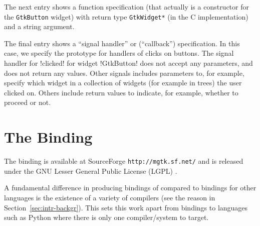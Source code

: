 \documentclass[workingdraft]{usetex-v1}
\begin{document}
The next entry shows a function specification (that actually is a
constructor for the \texttt{GtkButton} widget) with return type
\texttt{GtkWidget*} (in the C implementation) and a string argument.

The final entry shows a ``signal handler'' or (``callback'')
specification. In this case, we specify the prototype for handlers
of clicks on buttons. The signal handler for !clicked! for widget
!GtkButton! does not accept any parameters, and does not return any
values. Other signals includes parameters to, for example, specify
which widget in a collection of widgets (for example in trees) the
user clicked on. Others include return values to indicate, for example,
whether to proceed or not.









\section{The \mgtk Binding}
\label{sec:mgtk-binding}

The \mgtk binding is available at SourceForge \texttt{http://mgtk.sf.net/}
and is released under the GNU Lesser General Public License
(LGPL) \cite{LGPL:1999}.

A fundamental difference in producing \sml bindings of \gtk compared
to bindings for other languages is the existence of a variety of
compilers (see the reason in Section~\ref{sec:intr-backgr}). This sets
this work apart from bindings to languages such as Python where
there is only one compiler/system to target. 
\end{document}
